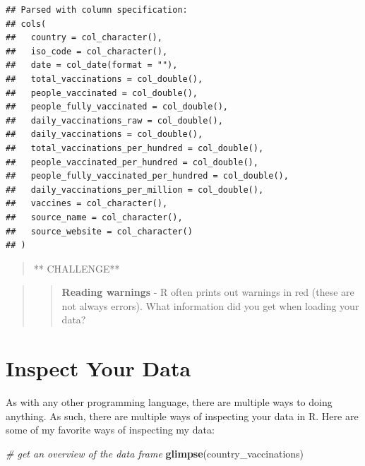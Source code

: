 \documentclass[
]{book}
\newenvironment{Shaded}{\begin{snugshade}}{\end{snugshade}}
\newcommand{\CommentTok}[1]{\textcolor[rgb]{0.56,0.35,0.01}{\textit{#1}}}
\newcommand{\KeywordTok}[1]{\textcolor[rgb]{0.13,0.29,0.53}{\textbf{#1}}}
\newcommand{\NormalTok}[1]{#1}
\begin{document}
\begin{verbatim}
## Parsed with column specification:
## cols(
##   country = col_character(),
##   iso_code = col_character(),
##   date = col_date(format = ""),
##   total_vaccinations = col_double(),
##   people_vaccinated = col_double(),
##   people_fully_vaccinated = col_double(),
##   daily_vaccinations_raw = col_double(),
##   daily_vaccinations = col_double(),
##   total_vaccinations_per_hundred = col_double(),
##   people_vaccinated_per_hundred = col_double(),
##   people_fully_vaccinated_per_hundred = col_double(),
##   daily_vaccinations_per_million = col_double(),
##   vaccines = col_character(),
##   source_name = col_character(),
##   source_website = col_character()
## )
\end{verbatim}

\begin{quote}
** CHALLENGE**
\end{quote}

\begin{quote}
\begin{quote}
\textbf{Reading warnings} - R often prints out warnings in red (these are not always errors). What information did you get when loading your data?
\end{quote}
\end{quote}

\hypertarget{inspect-your-data}{%
\section{Inspect Your Data}\label{inspect-your-data}}

As with any other programming language, there are multiple ways to doing anything. As such, there are multiple ways of inspecting your data in R. Here are some of my favorite ways of inspecting my data:

\begin{Shaded}
\begin{Highlighting}[]
\CommentTok{# get an overview of the data frame}
\KeywordTok{glimpse}\NormalTok{(country_vaccinations)}
\end{Highlighting}
\end{Shaded}
\end{document}
